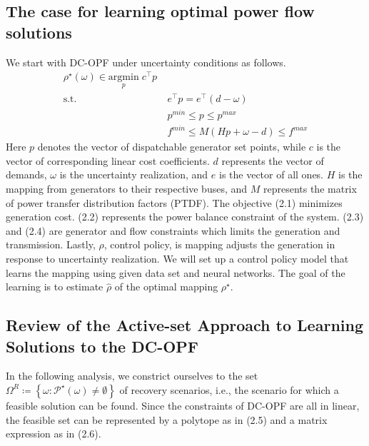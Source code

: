 \documentclass[11pt]{article}
\begin{document}
\subsection{The case for learning optimal power flow solutions}
We start with DC-OPF under uncertainty conditions as follows.
\begin{align}\label{eq:opf}
\rho^{\star}\left (  \omega \right )\in \underset{p}{\mathrm{argmin}} \; c^{\top }p \\
\textrm{s.t.} ~ &~ e^{\top }p=e^{\top }\left ( d -\omega  \right ) \\
~&~ p^{min}\leq p\leq p^{max} \\
~&~ f^{min}\leq M\left ( Hp +\omega -d \right )  \leq f^{max}
\end{align}
Here $p$ denotes the vector of dispatchable generator set points, while $c$ is the vector of corresponding linear cost coefficients.  $d$ represents the vector of demands, $\omega$ is the uncertainty realization, and $e$ is the vector of all ones. $H$ is the mapping from generators to their respective buses, and $M$ represents the matrix of power transfer distribution factors (PTDF). The objective (2.1) minimizes generation cost. (2.2) represents the power balance constraint of the system. (2.3) and (2.4) are generator and flow constraints which limits the generation and transmission. Lastly, $\rho$, control policy, is mapping adjusts the generation in response to uncertainty realization. We will set up a control policy model that learns the mapping using given data set and neural networks. The goal of the learning is to estimate $\hat{\rho}$ of the optimal mapping $\rho^{\star}$.

\subsection{Review of the Active-set Approach to Learning Solutions to the DC-OPF}

In the following analysis, we constrict ourselves to the set $\Omega^{R}\coloneqq\left \{ \omega:\mathcal{P}^{\star} \left ( \omega \right )\neq \emptyset \right \}$ of recovery scenarios, i.e., the scenario for which a feasible solution can be found. Since the constraints of DC-OPF are all in linear, the feasible set can be represented by a polytope as in (2.5) and a matrix expression as in (2.6).

\end{document}
